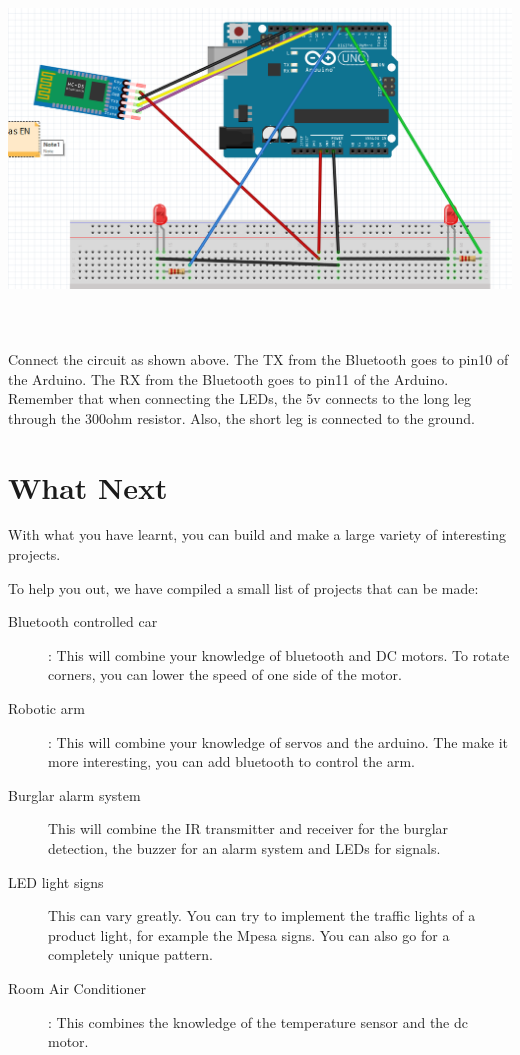 \documentclass[14pt, oneside]{memoir}
\begin{document}
\includegraphics[width=6.89091in,height=3.81659in]{circuit_images/bluetooth.png}


Connect the circuit as shown above. The TX from the Bluetooth goes to
pin10 of the Arduino. The RX from the Bluetooth goes to pin11 of the
Arduino.
\\
Remember that when connecting the LEDs, the 5v connects to the long leg
through the 300ohm resistor. Also, the short leg is connected to the
ground.



\chapter{What Next}

With what you have learnt, you can build and make a large variety
of interesting projects.

To help you out, we have compiled a small list of projects that
can be made:
\begin{description}
    \item [Bluetooth controlled car]: This will combine your
        knowledge of bluetooth and DC motors. To rotate corners,
        you can lower the speed of one side of the motor.
    \item [Robotic arm]: This will combine your knowledge of
        servos and the arduino. The make it more interesting, you
        can add bluetooth to control the arm.
    \item [Burglar alarm system] This will combine the IR
        transmitter and receiver for the burglar detection, the
        buzzer for an alarm system and LEDs for signals.
    \item [LED light signs] This can vary greatly. You can try to
        implement the traffic lights of a product light, for
        example the Mpesa signs. You can also go for a completely
        unique pattern.
    \item [Room Air Conditioner]: This combines the knowledge of
        the temperature sensor and the dc motor.

\end{description}
\end{document}
